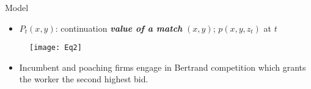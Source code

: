 \documentclass[10pt]{beamer}
\begin{document}
\begin{frame}{Model}

\begin{itemize}

\item $P_t(x, y)$: continuation \textbf{\textit{value of a match}} $(x, y)$; $p(x, y, z_t)$ at $t$

\end{itemize}

\begin{figure}
    \texttt{[image: Eq2]}
  \end{figure}

\begin{itemize}


\item Incumbent and poaching firms engage in Bertrand competition which grants the worker the second highest bid.

	\begin{itemize} 
	\end{itemize}
	
\end{itemize}

\end{frame}
\end{document}
